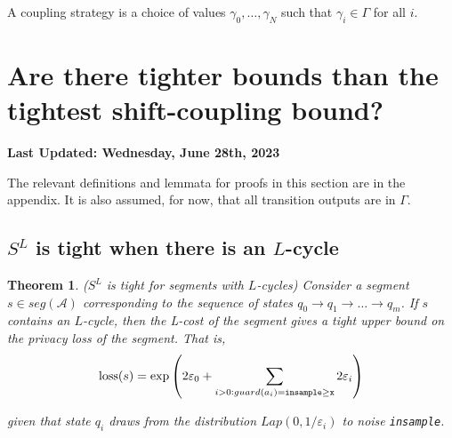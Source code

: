 \documentclass{article}
\newtheorem{theorem}{Theorem}
\renewcommand{\epsilon}{\varepsilon}
\newcommand{\loss}{\textup{loss}}
\newcommand{\insamplegeqx}{\textup{\texttt{insample$\geq$x}}}
\newcommand{\insample}{\textup{\texttt{insample}}}
\newcommand{\1}{\langle 1 \rangle}
\newcommand{\2}{\langle 2 \rangle}
\begin{document}
A coupling strategy is a choice of values $\gamma_0, \dots, \gamma_N$ such that $\gamma_i \in \Gamma$ for all $i$. 

\section{Are there tighter bounds than the tightest shift-coupling bound?}

\textbf{Last Updated: Wednesday, June 28th, 2023}

The relevant definitions and lemmata for proofs in this section are in the appendix. It is also assumed, for now, that all transition outputs are in $\Gamma$. 

\subsection{$S^L$ is tight when there is an $L$-cycle}

\begin{theorem} ($S^L$ is tight for segments with $L$-cycles)
    Consider a segment $s \in seg(\mathcal{A})$ corresponding to the sequence of states $q_0 \to q_1 \to \dots \to q_m$. If $s$ contains an $L$-cycle, then the L-cost of the segment gives a tight upper bound on the privacy loss of the segment. That is, \[\loss(s) =  \exp\left(2 \epsilon_0 + \sum_{i > 0: guard(a_i) = \insamplegeqx} 2\epsilon_i \right)\]

    given that state $q_i$ draws from the distribution $Lap(0, 1/\epsilon_i)$ to noise \insample.
\end{theorem}
\end{document}

